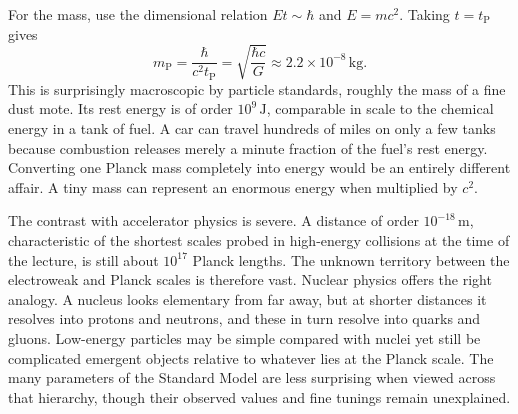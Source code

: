 For the mass, use the dimensional relation \(Et\sim\hbar\) and \(E=mc^2\). Taking \(t=t_{\mathrm P}\) gives
\begin{equation}
m_{\mathrm P}
=\frac{\hbar}{c^2t_{\mathrm P}}
=\sqrt{\frac{\hbar c}{G}}
\approx 2.2\times10^{-8}\,\mathrm{kg}.
\label{eq:c10-planck-mass}
\end{equation}
This is surprisingly macroscopic by particle standards, roughly the mass of a fine dust mote. Its rest energy is of order \(10^9\,\mathrm J\), comparable in scale to the chemical energy in a tank of fuel. A car can travel hundreds of miles on only a few tanks because combustion releases merely a minute fraction of the fuel's rest energy. Converting one Planck mass completely into energy would be an entirely different affair. A tiny mass can represent an enormous energy when multiplied by \(c^2\).

The contrast with accelerator physics is severe. A distance of order \(10^{-18}\,\mathrm m\), characteristic of the shortest scales probed in high-energy collisions at the time of the lecture, is still about \(10^{17}\) Planck lengths. The unknown territory between the electroweak and Planck scales is therefore vast. Nuclear physics offers the right analogy. A nucleus looks elementary from far away, but at shorter distances it resolves into protons and neutrons, and these in turn resolve into quarks and gluons. Low-energy particles may be simple compared with nuclei yet still be complicated emergent objects relative to whatever lies at the Planck scale. The many parameters of the Standard Model are less surprising when viewed across that hierarchy, though their observed values and fine tunings remain unexplained.

\begin{classroomqa}
\end{classroomqa}

